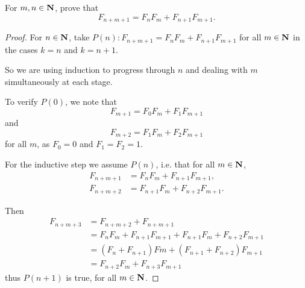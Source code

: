 \begin{prbm}
For $m,n\in\mathbf N$, prove that
\[ F_{n+m+1}=F_nF_m+F_{n+1}F_{m+1}. \]
\end{prbm}

\begin{proof}
For $n\in\mathbf N$, take $P(n):F_{n+m+1}=F_nF_m+F_{n+1}F_{m+1}$ for all $m\in\mathbf N$ in the cases $k=n$ and $k=n+1$.

So we are using induction to progress through $n$ and dealing with $m$ simultaneously at each stage. 

To verify $P(0)$, we note that
\[ F_{m+1}=F_0F_m+F_1F_{m+1} \]
and
\[ F_{m+2}=F_1F_m+F_2F_{m+1} \]
for all $m$, as $F_0=0$ and $F_1=F_2=1$.

For the inductive step we assume $P(n)$, i.e. that for all $m\in\mathbf N$,
\begin{align*}
F_{n+m+1}&=F_nF_m+F_{n+1}F_{m+1},\\
F_{n+m+2}&=F_{n+1}F_m+F_{n+2}F_{m+1}.
\end{align*}

Then
\begin{align*}
F_{n+m+3}
&=F_{n+m+2}+F_{n+m+1}\\
&=F_n F_m+F_{n+1}F_{m+1}+F_{n+1}F_m+F_{n+2}F_{m+1}\\
&=(F_n+F_{n+1})Fm+(F_{n+1}+F_{n+2})F_{m+1}\\
&=F_{n+2}F_m+F_{n+3}F_{m+1}
\end{align*}
thus $P(n+1)$ is true, for all $m\in\mathbf N$.
\end{proof}